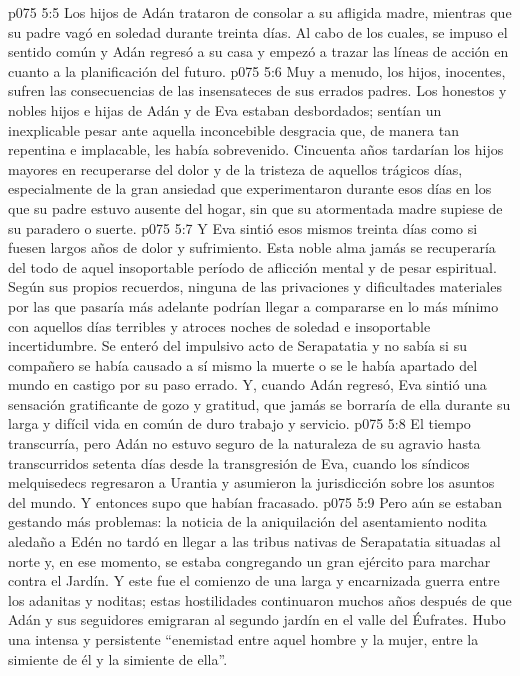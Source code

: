 \vs p075 5:5 Los hijos de Adán trataron de consolar a su afligida madre, mientras que su padre vagó en soledad durante treinta días. Al cabo de los cuales, se impuso el sentido común y Adán regresó a su casa y empezó a trazar las líneas de acción en cuanto a la planificación del futuro.
\vs p075 5:6 Muy a menudo, los hijos, inocentes, sufren las consecuencias de las insensateces de sus errados padres. Los honestos y nobles hijos e hijas de Adán y de Eva estaban desbordados; sentían un inexplicable pesar ante aquella inconcebible desgracia que, de manera tan repentina e implacable, les había sobrevenido. Cincuenta años tardarían los hijos mayores en recuperarse del dolor y de la tristeza de aquellos trágicos días, especialmente de la gran ansiedad que experimentaron durante esos días en los que su padre estuvo ausente del hogar, sin que su atormentada madre supiese de su paradero o suerte.
\vs p075 5:7 Y Eva sintió esos mismos treinta días como si fuesen largos años de dolor y sufrimiento. Esta noble alma jamás se recuperaría del todo de aquel insoportable período de aflicción mental y de pesar espiritual. Según sus propios recuerdos, ninguna de las privaciones y dificultades materiales por las que pasaría más adelante podrían llegar a compararse en lo más mínimo con aquellos días terribles y atroces noches de soledad e insoportable incertidumbre. Se enteró del impulsivo acto de Serapatatia y no sabía si su compañero se había causado a sí mismo la muerte o se le había apartado del mundo en castigo por su paso errado. Y, cuando Adán regresó, Eva sintió una sensación gratificante de gozo y gratitud, que jamás se borraría de ella durante su larga y difícil vida en común de duro trabajo y servicio.
\vs p075 5:8 \pc El tiempo transcurría, pero Adán no estuvo seguro de la naturaleza de su agravio hasta transcurridos setenta días desde la transgresión de Eva, cuando los síndicos melquisedecs regresaron a Urantia y asumieron la jurisdicción sobre los asuntos del mundo. Y entonces supo que habían fracasado.
\vs p075 5:9 \pc Pero aún se estaban gestando más problemas: la noticia de la aniquilación del asentamiento nodita aledaño a Edén no tardó en llegar a las tribus nativas de Serapatatia situadas al norte y, en ese momento, se estaba congregando un gran ejército para marchar contra el Jardín. Y este fue el comienzo de una larga y encarnizada guerra entre los adanitas y noditas; estas hostilidades continuaron muchos años después de que Adán y sus seguidores emigraran al segundo jardín en el valle del Éufrates. Hubo una intensa y persistente “enemistad entre aquel hombre y la mujer, entre la simiente de él y la simiente de ella”.
